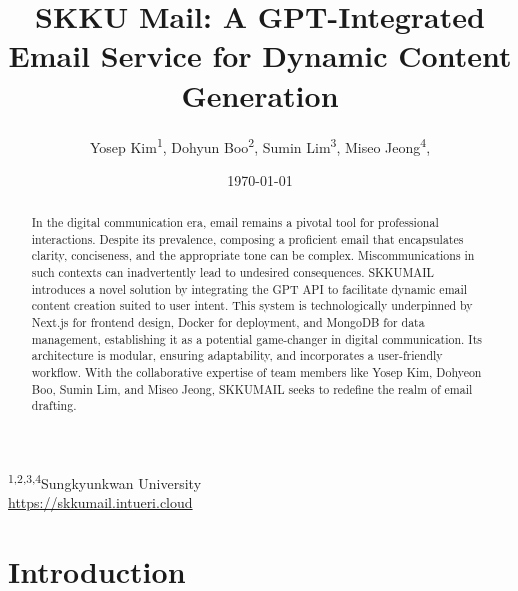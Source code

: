 \usepackage{graphicx}
\usepackage{amsmath}
\usepackage{listings}
\usepackage{hyperref}
\usepackage{colortbl}
\usepackage{array}
\usepackage{tabularx}
\usepackage{caption}
\usepackage[a4paper, margin=1in]{geometry}
\usepackage{parskip}
\usepackage{titlesec}
\usepackage{xcolor}

\titleformat{\section}[block]{\normalfont\Large\bfseries\color{darkblue}}{\thesection}{1em}{}



\title{SKKU Mail: A GPT-Integrated Email Service for Dynamic Content Generation}
\author{
    Yosep Kim\textsuperscript{1}, 
    Dohyun Boo\textsuperscript{2}, 
    Sumin Lim\textsuperscript{3}, 
    Miseo Jeong\textsuperscript{4}, 
}
\date{\today}


\maketitle

\begin{center}
	\textsuperscript{1,2,3,4}Sungkyunkwan University\\
	\href{https://skkumail.intueri.cloud}{https://skkumail.intueri.cloud}
\end{center}
\begin{abstract}
	In the digital communication era, email remains a pivotal tool for professional interactions. Despite its prevalence, composing a proficient email that encapsulates clarity, conciseness, and the appropriate tone can be complex. Miscommunications in such contexts can inadvertently lead to undesired consequences. SKKUMAIL introduces a novel solution by integrating the GPT API to facilitate dynamic email content creation suited to user intent. This system is technologically underpinned by Next.js for frontend design, Docker for deployment, and MongoDB for data management, establishing it as a potential game-changer in digital communication. Its architecture is modular, ensuring adaptability, and incorporates a user-friendly workflow. With the collaborative expertise of team members like Yosep Kim, Dohyeon Boo, Sumin Lim, and Miseo Jeong, SKKUMAIL seeks to redefine the realm of email drafting.
\end{abstract}
\section{Introduction}

